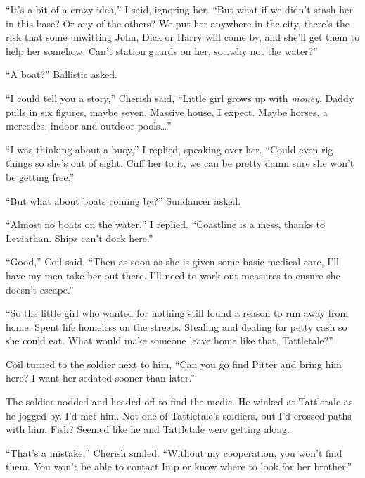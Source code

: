 ``It's a bit of a crazy idea,'' I said, ignoring her.  ``But what if we didn't stash her in this base?  Or any of the others?  We put her anywhere in the city, there's the risk that some unwitting John, Dick or Harry will come by, and she'll get them to help her somehow.  Can't station guards on her, so\ldots why not the water?''



``A boat?'' Ballistic asked.



``I could tell you a story,'' Cherish said, ``Little girl grows up with \emph{money}.  Daddy pulls in six figures, maybe seven.  Massive house, I expect.  Maybe horses, a mercedes, indoor and outdoor pools\ldots''



``I was thinking about a buoy,'' I replied, speaking over her.  ``Could even rig things so she's out of sight.  Cuff her to it, we can be pretty damn sure she won't be getting free.''



``But what about boats coming by?'' Sundancer asked.



``Almost no boats on the water,'' I replied.  ``Coastline is a mess, thanks to Leviathan.  Ships can't dock here.''



``Good,'' Coil said.  ``Then as soon as she is given some basic medical care, I'll have my men take her out there.  I'll need to work out measures to ensure she doesn't escape.''



``So the little girl who wanted for nothing still found a reason to run away from home.  Spent life homeless on the streets.  Stealing and dealing for petty cash so she could eat.  What would make someone leave home like that, Tattletale?''



Coil turned to the soldier next to him, ``Can you go find Pitter and bring him here?  I want her sedated sooner than later.''



The soldier nodded and headed off to find the medic.  He winked at Tattletale as he jogged by.  I'd met him.  Not one of Tattletale's soldiers, but I'd crossed paths with him.  Fish?  Seemed like he and Tattletale were getting along.



``That's a mistake,'' Cherish smiled.  ``Without my cooperation, you won't find them.  You won't be able to contact Imp or know where to look for her brother.''



